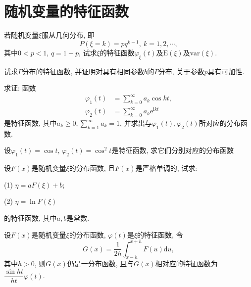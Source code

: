 \chapter{随机变量的特征函数}
\begin{yyEx}
		若随机变量$\xi$服从几何分布, 即
		\begin{equation}
			P(\xi = k) = pq^{k-1},~k=1,2,\cdots,
		\end{equation}
		其中$0<p<1$, $q = 1-p$, 试求$\xi$的特征函数$\varphi_\xi(t)$及$\mathrm{E}(\xi)$及$\mathrm{var}(\xi)$.
\end{yyEx}

\begin{yyEx}
	试求$\Gamma$分布的特征函数, 并证明对具有相同参数$b$的$\Gamma$分布, 关于参数$p$具有可加性.
\end{yyEx}

\begin{yyEx}
	求证: 函数
	\begin{align}
		\varphi_1(t) &= \sum_{k=0}^{\infty}a_k\cos kt,\nonumber\\
		\varphi_2(t) &= \sum_{k=0}^{\infty}a_k\mathrm{e}^{\mathrm{i}kt}
	\end{align}
	是特征函数, 其中$a_k\geqslant 0,\sum\limits_{k=1}^{\infty}a_k = 1$, 并求出与$\varphi_1(t),\varphi_2(t)$所对应的分布函数.
\end{yyEx}

\begin{yyEx}
	设$\varphi_1(t) = \cos t$, $\varphi_2(t) = \cos^2 t$是特征函数, 求它们分别对应的分布函数
\end{yyEx}

\begin{yyEx}
	设$F(x)$是随机变量$\xi$的分布函数, 且$F(x)$是严格单调的, 试求:
	\begin{blist}
		\item[(1)]$\eta = aF(\xi)+b$;
		\item[(2)]$\eta = \ln F(\xi)$
	\end{blist}
的特征函数, 其中$a,b$是常数.
\end{yyEx}

\begin{yyEx}
	设$F(x)$是随机变量$\xi$的分布函数, $\varphi(t)$是$\xi$的特征函数, 令\begin{equation}
		G(x) = \frac{1}{2h}\int_{x-h}^{x+h}F(u)\mathrm{d}u,
	\end{equation}
	其中$h>0$, 则$G(x)$仍是一分布函数, 且与$G(x)$相对应的特征函数为$\dfrac{\sin ht}{ht}\varphi(t)$.
\end{yyEx}

